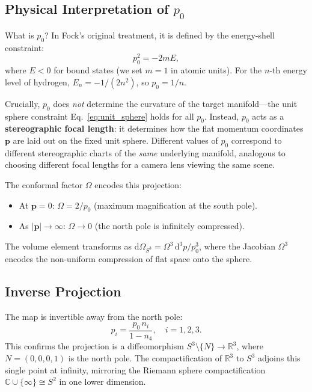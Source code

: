 \documentclass[aps,pra,twocolumn,superscriptaddress,longbibliography]{revtex4-2}
\begin{document}
\subsection{Physical Interpretation of $p_0$}

What is $p_0$? In Fock's original treatment, it is defined by the energy-shell constraint:
\begin{equation}
p_0^2 = -2m E,
\label{eq:energy_shell}
\end{equation}
where $E < 0$ for bound states (we set $m = 1$ in atomic units). For the $n$-th energy level of hydrogen, $E_n = -1/(2n^2)$, so $p_0 = 1/n$.

Crucially, $p_0$ does \textit{not} determine the curvature of the target manifold---the unit sphere constraint Eq.~\eqref{eq:unit_sphere} holds for all $p_0$. Instead, $p_0$ acts as a \textbf{stereographic focal length}: it determines how the flat momentum coordinates $\mathbf{p}$ are laid out on the fixed unit sphere. Different values of $p_0$ correspond to different stereographic charts of the \textit{same} underlying manifold, analogous to choosing different focal lengths for a camera lens viewing the same scene.

The conformal factor $\Omega$ encodes this projection:
\begin{itemize}
\item At $\mathbf{p} = 0$: $\Omega = 2/p_0$ (maximum magnification at the south pole).
\item As $|\mathbf{p}| \to \infty$: $\Omega \to 0$ (the north pole is infinitely compressed).
\end{itemize}
The volume element transforms as $\mathrm{d}\Omega_{S^3} = \Omega^3\, \mathrm{d}^3p/p_0^3$, where the Jacobian $\Omega^3$ encodes the non-uniform compression of flat space onto the sphere.

\subsection{Inverse Projection}

The map is invertible away from the north pole:
\begin{equation}
p_i = \frac{p_0\, n_i}{1 - n_4}, \quad i = 1, 2, 3.
\label{eq:inverse}
\end{equation}
This confirms the projection is a diffeomorphism $S^3 \setminus \{N\} \to \mathbb{R}^3$, where $N = (0,0,0,1)$ is the north pole. The compactification of $\mathbb{R}^3$ to $S^3$ adjoins this single point at infinity, mirroring the Riemann sphere compactification $\mathbb{C} \cup \{\infty\} \cong S^2$ in one lower dimension.
\end{document}

